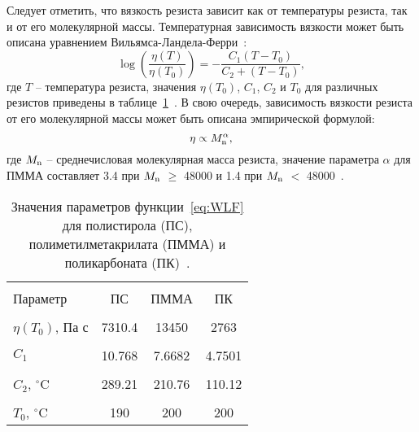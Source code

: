 Следует отметить, что вязкость резиста зависит как от температуры резиста, так и от его молекулярной массы.
Температурная зависимость вязкости может быть описана уравнением Вильямса-Ландела-Ферри~\cite{bird1987dynamics_WLF}:
\begin{equation} \label{eq:WLF}
	\log \left( \frac{\eta(T)}{\eta(T_0)} \right) = -\frac{C_1(T-T_0)}{C_2+(T-T_0)},
\end{equation}
где $T$ -- температура резиста, значения $\eta(T_0)$, $C_1$, $C_2$ и $T_0$ для различных резистов приведены в таблице~\ref{table:WLF}~\cite{aho2008measurement_WLF}.
В свою очередь, зависимость вязкости резиста от его молекулярной массы может быть описана эмпирической формулой:
\begin{equation} \label{eq:3p4_3p1}
	\eta \propto M_\mathrm{n}^\alpha,
\end{equation}
где $M_\mathrm{n}$ -- среднечисловая молекулярная масса резиста, значение параметра $\alpha$ для ПММА составляет 3.4 при $M_\mathrm{n}$ $\geq$ 48000 и 1.4 при $M_\mathrm{n}$ $<$ 48000~\cite{Leveder_2010, Bueche_3p4_1p4}.

\begin{table}[h]
	\vspace{1em}
	\centering
	\caption{Значения параметров функции~\ref{eq:WLF} для полистирола (ПС), полиметилметакрилата (ПММА) и поликарбоната (ПК)~\cite{aho2008measurement_WLF}.}
	\begin{tabular}{l c c c}
		\hline \hline \\ [-1em]
		Параметр \hspace{2em} & ПС \hspace{2em} & ПММА \hspace{2em} & ПК
		\\ \hline \\ [-1em]
		$\eta(T_0)$, Па с \hspace{2em} & 7310.4 \hspace{2em} & 13450 \hspace{2em} & 2763
		\\ \\ [-1em]
		$C_1$ \hspace{2em} & 10.768 \hspace{2em} & 7.6682 \hspace{2em} & 4.7501
		\\ \\ [-1em]
		$C_2$, $^\circ$C \hspace{2em} & 289.21 \hspace{2em} & 210.76 \hspace{2em} & 110.12
		\\ \\ [-1em]
		$T_0$, $^\circ$C \hspace{2em} & 190 \hspace{2em} & 200 \hspace{2em} & 200
		\\ \hline \hline
	\end{tabular}
\label{table:WLF}
\end{table}


